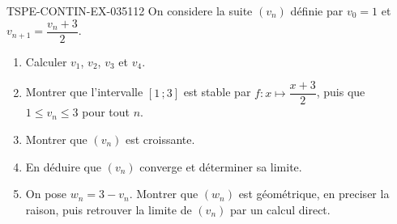 \begin{exercice}{TSPE-CONTIN-EX-035}{1}{12}
On considere la suite $(v_n)$ définie par $v_0 = 1$ et $v_{n+1} = \dfrac{v_n + 3}{2}$.
\begin{enumerate}
  \item Calculer $v_1$, $v_2$, $v_3$ et $v_4$.
  \item Montrer que l'intervalle $[1\,;3]$ est stable par $f : x \mapsto \dfrac{x+3}{2}$, puis que $1 \leq v_n \leq 3$ pour tout $n$.
  \item Montrer que $(v_n)$ est croissante.
  \item En déduire que $(v_n)$ converge et déterminer sa limite.
  \item On pose $w_n = 3 - v_n$. Montrer que $(w_n)$ est géométrique, en preciser la raison, puis retrouver la limite de $(v_n)$ par un calcul direct.
\end{enumerate}
\end{exercice}
